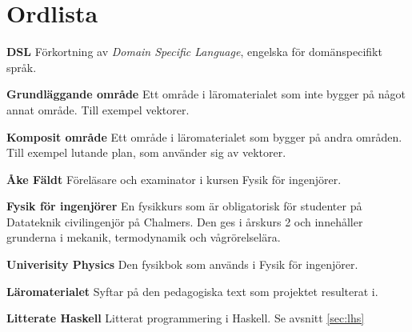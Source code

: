 
\chapter*{Ordlista}


\textbf{DSL} Förkortning av \textit{Domain Specific Language}, engelska för domänspecifikt språk.

\textbf{Grundläggande område} Ett område i läromaterialet som inte bygger på något annat område. Till exempel vektorer.

\textbf{Komposit område} Ett område i läromaterialet som bygger på andra områden. Till exempel lutande plan, som använder sig av vektorer.

\textbf{Åke Fäldt} Föreläsare och examinator i kursen Fysik för ingenjörer.

\textbf{Fysik för ingenjörer} En fysikkurs som är obligatorisk för studenter på Datateknik civilingenjör på Chalmers. Den ges i årskurs 2 och innehåller grunderna i mekanik, termodynamik och vågrörelselära.

\textbf{Univerisity Physics} Den fysikbok som används i Fysik för ingenjörer.

\textbf{Läromaterialet} Syftar på den pedagogiska text som projektet resulterat i.

\textbf{Litterate Haskell} Litterat programmering i Haskell. Se avsnitt \ref{sec:lhs}